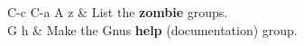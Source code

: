 {\begin{keys}{C-c C-a}
A z     & List the {\bf zombie} groups.\\
G h     & Make the Gnus {\bf help} (documentation) group.\\
\end{keys}
}

